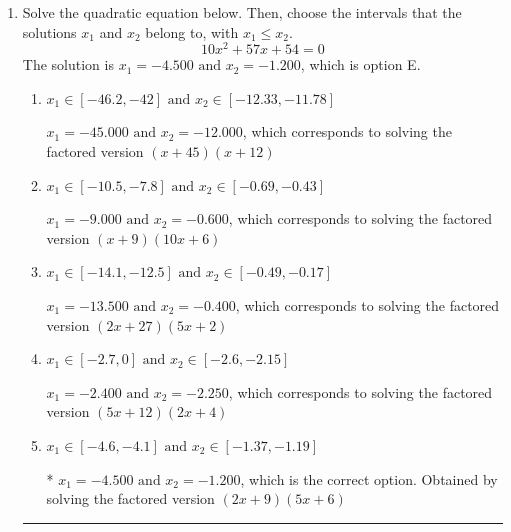 \documentclass{extbook}[14pt]
\newcommand{\litem}[1]{\item #1

\rule{\textwidth}{0.4pt}}
\begin{document}
\begin{enumerate}\litem{
Solve the quadratic equation below. Then, choose the intervals that the solutions $x_1$ and $x_2$ belong to, with $x_1 \leq x_2$.
\[ 10x^{2} +57 x + 54 = 0 \]The solution is \( x_1 = -4.500 \text{ and } x_2 = -1.200 \), which is option E.\begin{enumerate}[label=\Alph*.]
\item \( x_1 \in [-46.2, -42] \text{ and } x_2 \in [-12.33, -11.78] \)

$x_1 = -45.000 \text{ and } x_2 = -12.000$, which corresponds to solving the factored version $(x + 45)(x + 12)$
\item \( x_1 \in [-10.5, -7.8] \text{ and } x_2 \in [-0.69, -0.43] \)

$x_1 = -9.000 \text{ and } x_2 = -0.600$, which corresponds to solving the factored version $(x + 9)(10x + 6)$
\item \( x_1 \in [-14.1, -12.5] \text{ and } x_2 \in [-0.49, -0.17] \)

$x_1 = -13.500 \text{ and } x_2 = -0.400$, which corresponds to solving the factored version $(2x + 27)(5x + 2)$
\item \( x_1 \in [-2.7, 0] \text{ and } x_2 \in [-2.6, -2.15] \)

$x_1 = -2.400 \text{ and } x_2 = -2.250$, which corresponds to solving the factored version $(5x + 12)(2x + 4)$
\item \( x_1 \in [-4.6, -4.1] \text{ and } x_2 \in [-1.37, -1.19] \)

* $x_1 = -4.500 \text{ and } x_2 = -1.200$, which is the correct option. Obtained by solving the factored version $(2x + 9)(5x + 6)$
\end{enumerate}

}
\end{enumerate}
\end{document}
